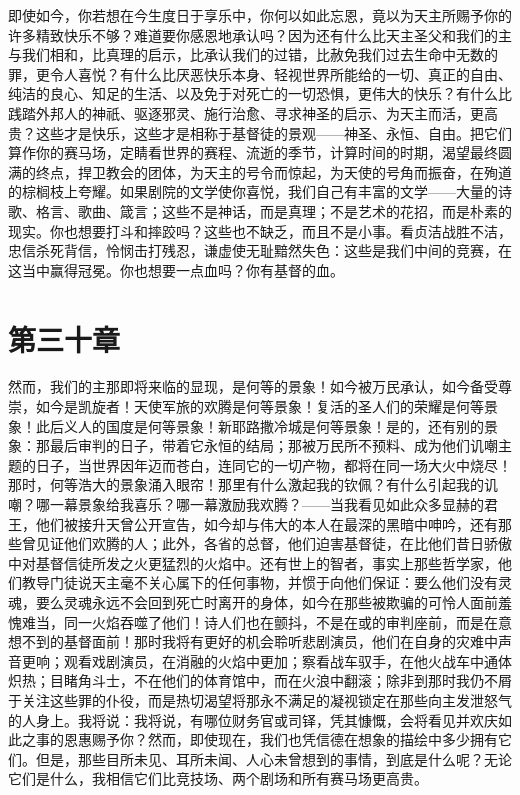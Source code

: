即使如今，你若想在今生度日于享乐中，你何以如此忘恩，竟以为天主所赐予你的许多精致快乐不够？难道要你感恩地承认吗？因为还有什么比天主圣父和我们的主与我们相和，比真理的启示，比承认我们的过错，比赦免我们过去生命中无数的罪，更令人喜悦？有什么比厌恶快乐本身、轻视世界所能给的一切、真正的自由、纯洁的良心、知足的生活、以及免于对死亡的一切恐惧，更伟大的快乐？有什么比践踏外邦人的神祇、驱逐邪灵、施行治愈、寻求神圣的启示、为天主而活，更高贵？这些才是快乐，这些才是相称于基督徒的景观——神圣、永恒、自由。把它们算作你的赛马场，定睛看世界的赛程、流逝的季节，计算时间的时期，渴望最终圆满的终点，捍卫教会的团体，为天主的号令而惊起，为天使的号角而振奋，在殉道的棕榈枝上夸耀。如果剧院的文学使你喜悦，我们自己有丰富的文学——大量的诗歌、格言、歌曲、箴言；这些不是神话，而是真理；不是艺术的花招，而是朴素的现实。你也想要打斗和摔跤吗？这些也不缺乏，而且不是小事。看贞洁战胜不洁，忠信杀死背信，怜悯击打残忍，谦虚使无耻黯然失色：这些是我们中间的竞赛，在这当中赢得冠冕。你也想要一点血吗？你有基督的血。\par


\section{第三十章}

然而，我们的主那即将来临的显现，是何等的景象！如今被万民承认，如今备受尊崇，如今是凯旋者！天使军旅的欢腾是何等景象！复活的圣人们的荣耀是何等景象！此后义人的国度是何等景象！新耶路撒冷城是何等景象！是的，还有别的景象：那最后审判的日子，带着它永恒的结局；那被万民所不预料、成为他们讥嘲主题的日子，当世界因年迈而苍白，连同它的一切产物，都将在同一场大火中烧尽！那时，何等浩大的景象涌入眼帘！那里有什么激起我的钦佩？有什么引起我的讥嘲？哪一幕景象给我喜乐？哪一幕激励我欢腾？——当我看见如此众多显赫的君王，他们被接升天曾公开宣告，如今却与伟大的本人在最深的黑暗中呻吟，还有那些曾见证他们欢腾的人；此外，各省的总督，他们迫害基督徒，在比他们昔日骄傲中对基督信徒所发之火更猛烈的火焰中。还有世上的智者，事实上那些哲学家，他们教导门徒说天主毫不关心属下的任何事物，并惯于向他们保证：要么他们没有灵魂，要么灵魂永远不会回到死亡时离开的身体，如今在那些被欺骗的可怜人面前羞愧难当，同一火焰吞噬了他们！诗人们也在颤抖，不是在或的审判座前，而是在意想不到的基督面前！那时我将有更好的机会聆听悲剧演员，他们在自身的灾难中声音更响；观看戏剧演员，在消融的火焰中更加；察看战车驭手，在他火战车中通体炽热；目睹角斗士，不在他们的体育馆中，而在火浪中翻滚；除非到那时我仍不屑于关注这些罪的仆役，而是热切渴望将那永不满足的凝视锁定在那些向主发泄怒气的人身上。我将说：我将说，有哪位财务官或司铎，凭其慷慨，会将看见并欢庆如此之事的恩惠赐予你？然而，即使现在，我们也凭信德在想象的描绘中多少拥有它们。但是，那些目所未见、耳所未闻、人心未曾想到的事情，到底是什么呢？无论它们是什么，我相信它们比竞技场、两个剧场和所有赛马场更高贵。\par

